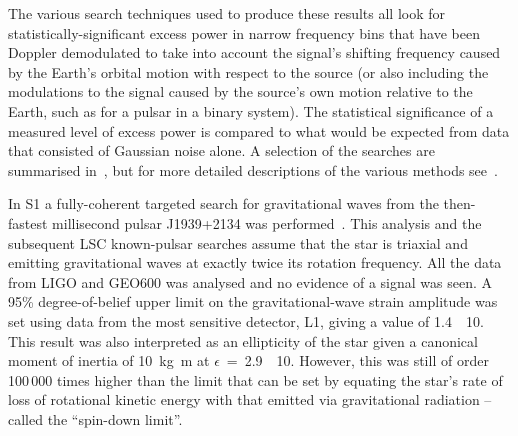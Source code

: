 The various search techniques used to produce these results all look for
statistically-significant excess power in narrow frequency bins that have been
Doppler demodulated to take into account the signal's shifting frequency caused
by the Earth's orbital motion with respect to the source (or also including the
modulations to the signal caused by the source's own motion relative to the
Earth, such as for a pulsar in a binary system). The statistical significance of
a measured level of excess power is compared to what would be expected from data
that consisted of Gaussian noise alone. A selection of the searches are
summarised in~\cite{Prix:2006}, but for more detailed descriptions of the
various methods see~\cite{Brady:2000, Krishnan:2004, Jaranowski:1998,
Abbott:2008e, Abbott:2007a, Dupuis:2005}.


In S1 a fully-coherent targeted search for gravitational waves from the then-fastest millisecond pulsar J1939+2134 was performed~\cite{Abbott:2004d}. This
analysis and the subsequent LSC known-pulsar searches assume that the star is
triaxial and emitting gravitational waves at exactly twice its rotation
frequency. All the data from LIGO and GEO600 was analysed and no evidence of a
signal was seen. A 95\% degree-of-belief upper limit on the gravitational-wave
strain amplitude was set using data from the most sensitive detector, L1, giving
a value of 1.4~\texttimes~10. This result was also interpreted as an
ellipticity of the star given a canonical moment of inertia of
10~kg~m at
$\epsilon$~=~2.9~\texttimes~10.  However, this was still of
order 100\,000 times higher than the limit that can be set by equating
the star's rate of loss of rotational kinetic energy with that emitted
via gravitational radiation -- called the ``spin-down limit''.


